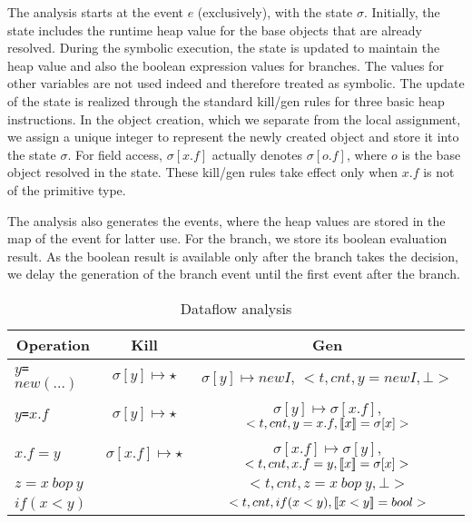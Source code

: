 The analysis starts at the event $e$ (exclusively), with the state $\sigma$.  Initially, the state includes the runtime heap value for the base objects that are already resolved. During the symbolic execution, the state is updated to maintain the heap value and also the boolean expression values for branches. The values for other variables are not used indeed and therefore treated as symbolic. The update of the state is realized through the   standard kill/gen rules for three basic heap instructions. In the object creation, which we separate from the local assignment, we assign a unique integer to represent the newly created object and store it into the state $\sigma$. For field access, $\sigma[x.f]$ actually denotes $\sigma[o.f]$, where  $o$ is the base object resolved in the state. 
These kill/gen rules take effect only when $x.f$  is not of the primitive type.

The analysis also generates the events, where the heap values are stored in the map of the event for latter use. For the branch, we store its boolean evaluation result.
As the boolean result is available only after the branch takes the decision, we delay the generation of the branch event until the first event after the branch. 




\begin{table*}
\centering
\begin{tabular}{l|c|c}
\multicolumn{1}{c|}{Operation} & {Kill} & {Gen} \\
\hline
{\tt $y$=$new (...)$} 			&  $\sigma[y] \mapsto \star$		&  $\sigma[y] \mapsto newI$, $<t, cnt, y=newI, \bot>$\\
{\tt $y$=$x.f$} 			&   $\sigma[y]\mapsto \star$			&  $\sigma[y] \mapsto \sigma[x.f]$, $<t, cnt, y=x.f, \lbrack\!\lbrack x \rbrack\!\rbrack=\sigma[x]>$  \\
{\tt $x.f=y$} & $\sigma[x.f] \mapsto \star$		&  $\sigma[x.f] \mapsto \sigma[y]$, $<t, cnt, x.f=y, \lbrack\!\lbrack x \rbrack\!\rbrack=\sigma[x]>$ \\
{\tt $z=x\  bop\  y$} & 		&  $<t, cnt, z=x\  bop\  y, \bot>$ \\
{\tt $if(x<y)$} & 	  &  $<t, cnt, if(x<y), \lbrack\!\lbrack x<y \rbrack\!\rbrack=bool>$\\
\end{tabular}
\caption{\label{table:killgen}Dataflow analysis}
\end{table*}




